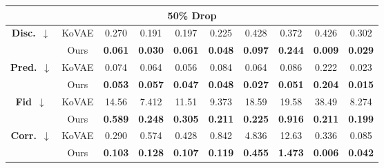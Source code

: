 \documentclass{article}
\theoremstyle{plain}
\theoremstyle{definition}
\theoremstyle{remark}
\begin{document}
{\begin{table*}[!t]
{\begin{tabular}{cc|cccccccc}
    \multicolumn{10}{c}{\textbf{50\% Drop}} \\
    \midrule
    \multirow{2}{*}{\textbf{Disc.}~$\downarrow$}
      & KoVAE 
          & 0.270 
          & 0.191 
          & 0.197 
          & 0.225 
          & 0.428 
          & 0.372 
          & 0.426 
          & 0.302 \\
      & Ours  
          & \cellcolor{blue!10}\textbf{0.061}
          & \cellcolor{blue!10}\textbf{0.030}
          & \cellcolor{blue!10}\textbf{0.061}
          & \cellcolor{blue!10}\textbf{0.048}
          & \cellcolor{blue!10}\textbf{0.097}
          & \cellcolor{blue!10}\textbf{0.244}
          & \cellcolor{blue!10}\textbf{0.009}
          & \cellcolor{blue!10}\textbf{0.029} \\
    \midrule
    \multirow{2}{*}{\textbf{Pred.}~$\downarrow$}
      & KoVAE 
          & 0.074 
          & 0.064 
          & 0.056 
          & 0.084 
          & 0.064 
          & 0.086 
          & 0.222 
          & 0.023 \\
      & Ours  
          & \cellcolor{blue!10}\textbf{0.053}
          & \cellcolor{blue!10}\textbf{0.057}
          & \cellcolor{blue!10}\textbf{0.047}
          & \cellcolor{blue!10}\textbf{0.048}
          & \cellcolor{blue!10}\textbf{0.027}
          & \cellcolor{blue!10}\textbf{0.051}
          & \cellcolor{blue!10}\textbf{0.204}
          & \cellcolor{blue!10}\textbf{0.015} \\
    \midrule
    \multirow{2}{*}{\textbf{Fid}~$\downarrow$}
      & KoVAE 
          & 14.56 
          & 7.412 
          & 11.51 
          & 9.373 
          & 18.59 
          & 19.58 
          & 38.49 
          & 8.274 \\
      & Ours  
          & \cellcolor{blue!10}\textbf{0.589}
          & \cellcolor{blue!10}\textbf{0.248}
          & \cellcolor{blue!10}\textbf{0.305}
          & \cellcolor{blue!10}\textbf{0.211}
          & \cellcolor{blue!10}\textbf{0.225}
          & \cellcolor{blue!10}\textbf{0.916}
          & \cellcolor{blue!10}\textbf{0.211}
          & \cellcolor{blue!10}\textbf{0.199} \\
    \midrule
    \multirow{2}{*}{\textbf{Corr.}~$\downarrow$}
      & KoVAE 
          & 0.290 
          & 0.574 
          & 0.428 
          & 0.842 
          & 4.836 
          & 12.63 
          & 0.336 
          & 0.085 \\
      & Ours  
          & \cellcolor{blue!10}\textbf{0.103}
          & \cellcolor{blue!10}\textbf{0.128}
          & \cellcolor{blue!10}\textbf{0.107}
          & \cellcolor{blue!10}\textbf{0.119}
          & \cellcolor{blue!10}\textbf{0.455}
          & \cellcolor{blue!10}\textbf{1.473}
          & \cellcolor{blue!10}\textbf{0.006}
          & \cellcolor{blue!10}\textbf{0.042} \\
    \midrule
    

\end{tabular}}
\end{table*}}
\end{document}
